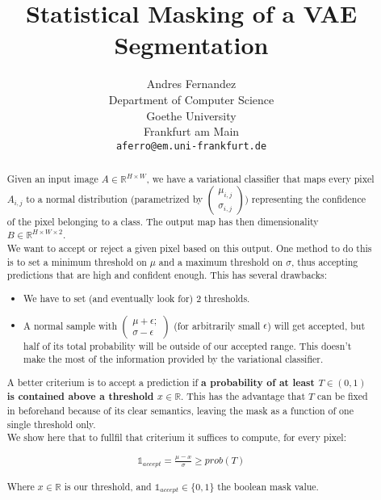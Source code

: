 \documentclass{article}
\title{Statistical Masking of a VAE Segmentation}
\author{
  Andres Fernandez\\ %
  Department of Computer Science\\
  Goethe University\\
  Frankfurt am Main \\
  \texttt{aferro@em.uni-frankfurt.de} \\
}
\numberwithin{equation}{section}
\begin{document}
\maketitle

\begin{abstract}

Given an input image $A \in \mathbb{R}^{H \times W}$, we have a variational classifier that maps every pixel $A_{i, j}$ to a normal distribution (parametrized by $\begin{pmatrix}\mu_{i, j} \\ \sigma_{i, j}\end{pmatrix})$ representing the confidence of the pixel belonging to a class. The output map has then dimensionality $B \in \mathbb{R}^{H \times W \times 2}$.\\

  We want to accept or reject a given pixel based on this output. One method to do this is to set a minimum threshold on $\mu$ and a maximum threshold on $\sigma$, thus accepting predictions that are high and confident enough. This has several drawbacks:\\
  \begin{itemize}
  \item We have to set (and eventually look for) 2 thresholds.
  \item A normal sample with $\begin{pmatrix}\mu + \epsilon; \\ \sigma - \epsilon\end{pmatrix}$ (for arbitrarily small $\epsilon$) will get accepted, but half of its total probability will be outside of our accepted range. This doesn't make the most of the information provided by the variational classifier.\\
  \end{itemize}

  A better criterium is to accept a prediction if \textbf{a probability of at least $T \in (0, 1)$ is contained above a threshold $x \in \mathbb{R}$}. This has the advantage that $T$ can be fixed in beforehand because of its clear semantics, leaving the mask as a function of one single threshold only.\\

  We show here that to fullfil that criterium it suffices to compute, for every pixel:

  \begin{equation} \label{criterium}
    \begin{aligned}
      \mathds{1}_{accept} = \frac{\mu - x}{\sigma} \geq prob(T)
    \end{aligned}
  \end{equation}

  Where $x \in \mathbb{R}$ is our threshold, and $\mathds{1}_{accept} \in \{0, 1\}$ the boolean mask value.

\end{abstract}
\end{document}

